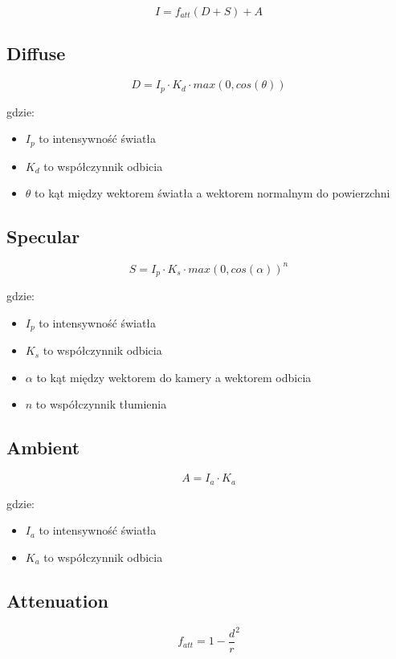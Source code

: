 \documentclass{../notatki}
\begin{document}
$$
I = f_{att}(D + S) + A
$$

\subsection{Diffuse}

$$
D = I_p \cdot K_d \cdot max(0, cos(\theta))
$$

gdzie:

\begin{itemize}
  \item $I_p$ to intensywność światła
  \item $K_d$ to współczynnik odbicia
  \item $\theta$ to kąt między wektorem światła a wektorem normalnym
    do powierzchni
\end{itemize}

\subsection{Specular}

$$
S = I_p \cdot K_s \cdot max(0, cos(\alpha))^n
$$

gdzie:

\begin{itemize}
  \item $I_p$ to intensywność światła
  \item $K_s$ to współczynnik odbicia
  \item $\alpha$ to kąt między wektorem do kamery a wektorem odbicia
  \item $n$ to współczynnik tłumienia
\end{itemize}

\subsection{Ambient}

$$
A = I_a \cdot K_a
$$

gdzie:

\begin{itemize}
  \item $I_a$ to intensywność światła
  \item $K_a$ to współczynnik odbicia
\end{itemize}

\subsection{Attenuation}

$$
f_{att} = 1 - \frac{d}{r}^2
$$
\end{document}
